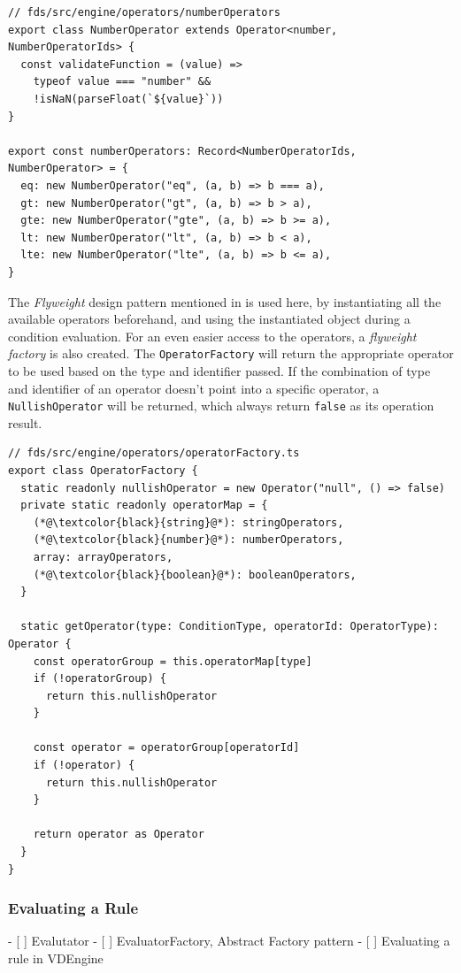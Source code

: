       \begin{lstlisting}[style=es6, caption={NumberOperator Example (TypeScript)}]
// fds/src/engine/operators/numberOperators
export class NumberOperator extends Operator<number, NumberOperatorIds> {
  const validateFunction = (value) =>
    typeof value === "number" &&
    !isNaN(parseFloat(`${value}`))
}

export const numberOperators: Record<NumberOperatorIds, NumberOperator> = {
  eq: new NumberOperator("eq", (a, b) => b === a),
  gt: new NumberOperator("gt", (a, b) => b > a),
  gte: new NumberOperator("gte", (a, b) => b >= a),
  lt: new NumberOperator("lt", (a, b) => b < a),
  lte: new NumberOperator("lte", (a, b) => b <= a),
} 
      \end{lstlisting}

      The \emph{Flyweight} design pattern mentioned in \autocite[pp. 195-206]{gamma-1995} is used here, by instantiating all the available operators beforehand, and using the instantiated object during a condition evaluation. For an even easier access to the operators, a \emph{flyweight factory} is also created. The \verb;OperatorFactory; will return the appropriate operator to be used based on the type and identifier passed. If the combination of type and identifier of an operator doesn't point into a specific operator, a \verb;NullishOperator; will be returned, which always return \verb;false; as its operation result. 
      
      \begin{lstlisting}[style=es6, caption={Operator factory (TypeScript)}]
// fds/src/engine/operators/operatorFactory.ts
export class OperatorFactory {
  static readonly nullishOperator = new Operator("null", () => false)
  private static readonly operatorMap = {
    (*@\textcolor{black}{string}@*): stringOperators,
    (*@\textcolor{black}{number}@*): numberOperators,
    array: arrayOperators,
    (*@\textcolor{black}{boolean}@*): booleanOperators,
  }

  static getOperator(type: ConditionType, operatorId: OperatorType): Operator {
    const operatorGroup = this.operatorMap[type]
    if (!operatorGroup) {
      return this.nullishOperator
    }

    const operator = operatorGroup[operatorId]
    if (!operator) {
      return this.nullishOperator
    }

    return operator as Operator
  }
}
      \end{lstlisting}

    \subsubsection{Evaluating a Rule} 
      - [ ] Evalutator
      - [ ] EvaluatorFactory, Abstract Factory pattern
      - [ ] Evaluating a rule in VDEngine
      
